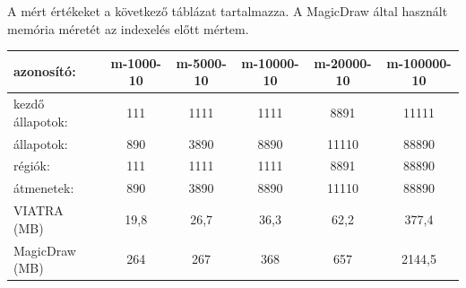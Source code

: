 A mért értékeket a  következő táblázat tartalmazza. A MagicDraw által használt memória méretét az indexelés előtt mértem.\\

\hspace*{-1cm}
\begin{tabular}{l|ccccc}
azonosító: & m-1000-10 & m-5000-10 & m-10000-10 & m-20000-10 & m-100000-10 \\
\hline
kezdő állapotok: & 111 & 1111 & 1111 & 8891  & 11111 \\
állapotok:  & 890 & 3890 & 8890 & 11110 & 88890 \\
régiók: & 111 & 1111 & 1111 & 8891 & 88890\\
átmenetek: & 890 & 3890 & 8890 & 11110 & 88890\\
\hline
VIATRA (MB) & 19,8 & 26,7 & 36,3 & 62,2 & 377,4\\
MagicDraw (MB) & 264 & 267 & 368 & 657 & 2144,5 \\
\end{tabular}
\hspace*{-1cm}\\
\\
 
